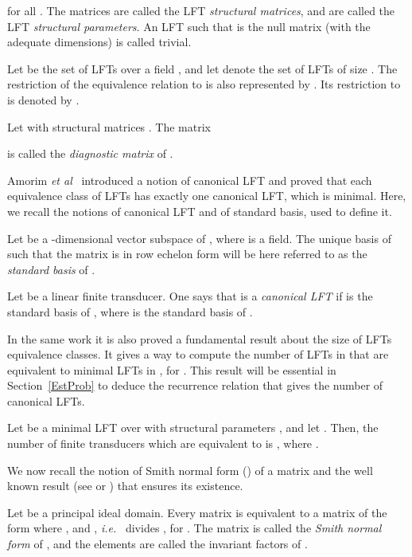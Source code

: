 \documentclass{ocg}
\newcommand{\LFT}{LFT}
\begin{document}
for all .  The matrices  are
called the \LFT{} \emph{structural matrices}, and  are called
the \LFT{} \emph{structural parameters}. An \LFT{} such that  is the
null matrix (with the adequate dimensions) is called trivial.

Let  be the set of \LFT{}s over a field , and let
 denote the set of \LFT{}s of size . The
restriction of the equivalence relation  to  is
also represented by . Its restriction to  is
denoted by .  

\begin{definition}
Let  with structural matrices . The
matrix

is called the \emph{diagnostic matrix} of . 
\end{definition}
Amorim \textit{et al}~\cite{AMRciaa14} introduced a notion of
canonical \LFT{} and proved that each equivalence class of \LFT{}s has
exactly one canonical \LFT{}, which is minimal. Here, we recall the notions of canonical \LFT{} and of standard basis, used to define it.

\begin{definition}
Let  be a -dimensional vector subspace of
, where  is a field. The unique basis
 of  such that the matrix  is in row echelon form will be here referred
to as the \emph{standard basis} of .
\end{definition}

\begin{definition}
  Let  be a
  linear finite transducer. One says that  is a \emph{canonical
    \LFT{}} if  is the standard
  basis of , where 
  is the standard basis of .
\end{definition}
In the same work it is also proved a fundamental result
about the size of \LFT{}s equivalence classes. It gives a way to
compute the number of \LFT{}s in  that are
equivalent to minimal \LFT{}s in , for . This result will be essential in Section~\ref{EstProb} to deduce
the recurrence relation that gives the number of canonical \LFT{}s.
\begin{theorem}\label{mainteo}
  Let  be a minimal \LFT{} over  with structural parameters , and let . Then, the number of
  finite transducers  which are equivalent to
   is , where .
\end{theorem}
We now recall
the notion of Smith normal form () of a matrix and the well
known result (see \cite{jacobson85:_basic_algeb_i} or \cite[Theorem
II.9]{Newman1972}) that ensures its existence.
\begin{theorem}\label{SNF} Let  be a principal ideal
  domain. Every matrix  is equivalent to a
  matrix of the form
  {\small}where ,  and , \textit{i.e.}~ divides , for
. The matrix  is called the \emph{Smith normal
  form} of , and the elements  are called the invariant
factors of .
\end{theorem}
\end{document}
